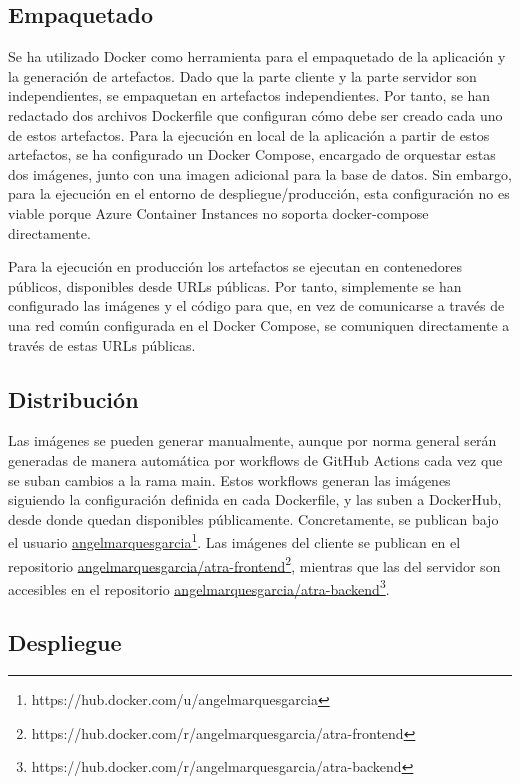 \subsection{Empaquetado}
Se ha utilizado Docker como herramienta para el empaquetado de la aplicación y la generación de artefactos. Dado que la parte cliente y la parte servidor son independientes, se empaquetan en artefactos independientes. Por tanto, se han redactado dos archivos Dockerfile que configuran cómo debe ser creado cada uno de estos artefactos. Para la ejecución en local de la aplicación a partir de estos artefactos, se ha configurado un Docker Compose, encargado de orquestar estas dos imágenes, junto con una imagen adicional para la base de datos. Sin embargo, para la ejecución en el entorno de despliegue/producción, esta configuración no es viable porque Azure Container Instances no soporta docker-compose directamente.

Para la ejecución en producción los artefactos se ejecutan en contenedores públicos, disponibles desde URLs públicas. Por tanto, simplemente se han configurado las imágenes y el código para que, en vez de comunicarse a través de una red común configurada en el Docker Compose, se comuniquen directamente a través de estas URLs públicas.

\subsection{Distribución}
Las imágenes se pueden generar manualmente, aunque por norma general serán generadas de manera automática por workflows de GitHub Actions cada vez que se suban cambios a la rama main. Estos workflows generan las imágenes siguiendo la configuración definida en cada Dockerfile, y las suben a DockerHub,  desde donde quedan disponibles públicamente. Concretamente, se publican bajo el usuario \href{https://hub.docker.com/u/angelmarquesgarcia}{\uline{angelmarquesgarcia}\footnote{\url{https://hub.docker.com/u/angelmarquesgarcia}}}. Las imágenes del cliente se publican en el repositorio 
\href{https://hub.docker.com/r/angelmarquesgarcia/atra-frontend}{\uline{angelmarquesgarcia/atra-frontend}\footnote{\url{https://hub.docker.com/r/angelmarquesgarcia/atra-frontend}}}, mientras que las del servidor son accesibles en el repositorio
\href{https://hub.docker.com/r/angelmarquesgarcia/atra-backend}{\uline{angelmarquesgarcia/atra-backend}\footnote{\url{https://hub.docker.com/r/angelmarquesgarcia/atra-backend}}}.


\subsection{Despliegue}

